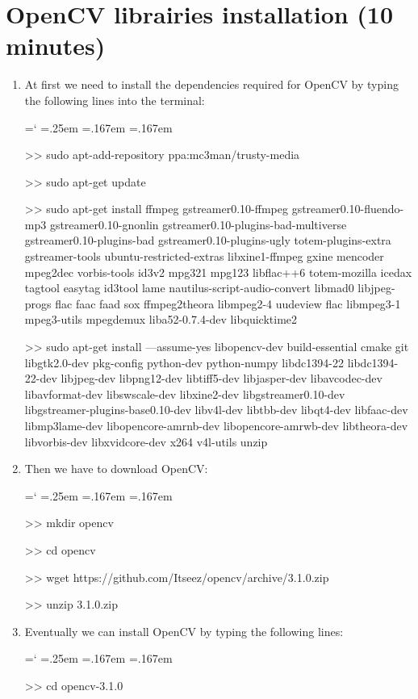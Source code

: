 \documentclass[12pt]{report}
\DeclareRobustCommand*{\ttfamily}{
  \origttfamily
  \hyphenchar\font=`\-\relax
  \fontdimen3\font=.25em\relax
  \fontdimen4\font=.167em\relax
  \fontdimen7\font=.167em\relax
}
\newenvironment{code}{\ttfamily}{}
\begin{document}
\section{OpenCV librairies installation (10 minutes)}
\begin{enumerate}
\item At first we need to install the dependencies required for OpenCV by typing the following lines into the terminal:

\begin{code}
>> sudo apt-add-repository ppa:mc3man/trusty-media

>> sudo apt-get update

>> sudo apt-get install ffmpeg gstreamer0.10-ffmpeg gstreamer0.10-fluendo-mp3 gstreamer0.10-gnonlin gstreamer0.10-plugins-bad-multiverse gstreamer0.10-plugins-bad gstreamer0.10-plugins-ugly totem-plugins-extra gstreamer-tools ubuntu-restricted-extras libxine1-ffmpeg gxine mencoder mpeg2dec vorbis-tools id3v2 mpg321 mpg123 libflac++6 totem-mozilla icedax tagtool easytag id3tool lame nautilus-script-audio-convert libmad0 libjpeg-progs flac faac faad sox ffmpeg2theora libmpeg2-4 uudeview flac libmpeg3-1 mpeg3-utils mpegdemux liba52-0.7.4-dev libquicktime2

>> sudo apt-get install ---assume-yes libopencv-dev build-essential cmake git libgtk2.0-dev pkg-config python-dev python-numpy libdc1394-22 libdc1394-22-dev libjpeg-dev libpng12-dev libtiff5-dev libjasper-dev libavcodec-dev libavformat-dev libswscale-dev libxine2-dev libgstreamer0.10-dev libgstreamer-plugins-base0.10-dev libv4l-dev libtbb-dev libqt4-dev libfaac-dev libmp3lame-dev libopencore-amrnb-dev libopencore-amrwb-dev libtheora-dev libvorbis-dev libxvidcore-dev x264 v4l-utils unzip
\end{code}

\item Then we have to download OpenCV:

\begin{code}
>> mkdir opencv

>> cd opencv

>> wget https://github.com/Itseez/opencv/archive/3.1.0.zip

>> unzip 3.1.0.zip
\end{code}


\item Eventually we can install OpenCV by typing the following lines:

\begin{code}
>> cd opencv-3.1.0


\end{code}
\end{enumerate}
\end{document}
